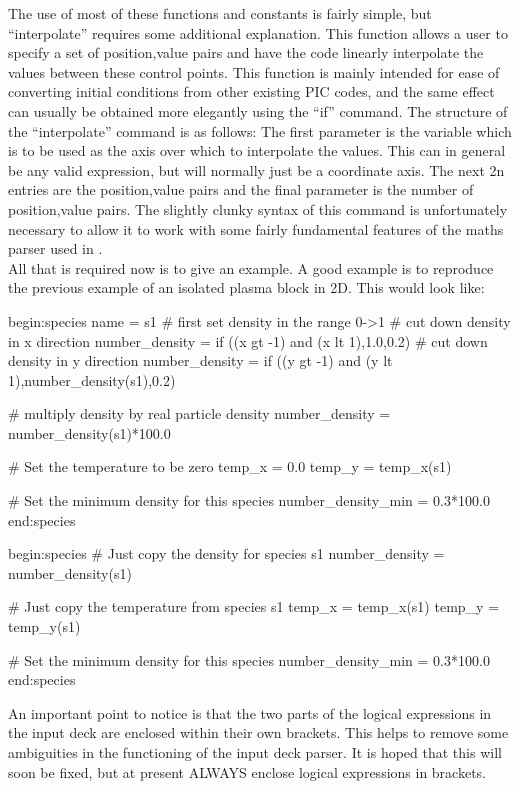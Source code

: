 The use of most of these functions and constants is fairly simple, but
``interpolate'' requires some additional explanation. This function allows a
user to specify a set of position,value pairs and have the code linearly
interpolate the values between these control points. This function is mainly
intended for ease of converting initial conditions from other existing PIC
codes, and the same effect can usually be obtained more elegantly using the
``if'' command. The structure of the ``interpolate'' command is as follows:
The first parameter is the variable which is to be used as the axis over which
to interpolate the values. This can in general be any valid expression, but
will normally just be a coordinate axis. The next 2n entries are the
position,value pairs and the final parameter is the number of position,value
pairs. The slightly clunky syntax of this command is unfortunately necessary to
allow it to work with some fairly fundamental features of the maths parser
used in {\EPOCH}.\\
All that is required now is to give an example.
A good example is to reproduce
the previous example of an isolated plasma block in 2D. This would look like:
\begin{boxverbatim}
begin:species
   name = s1
   # first set density in the range 0->1
   # cut down density in x direction
   number_density = if ((x gt -1) and (x lt 1),1.0,0.2)
   # cut down density in y direction
   number_density = if ((y gt -1) and (y lt 1),number_density(s1),0.2)

   # multiply density by real particle density
   number_density = number_density(s1)*100.0

   # Set the temperature to be zero
   temp_x = 0.0
   temp_y = temp_x(s1)

   # Set the minimum density for this species
   number_density_min = 0.3*100.0
end:species

begin:species
   # Just copy the density for species s1
   number_density = number_density(s1)

   # Just copy the temperature from species s1
   temp_x = temp_x(s1)
   temp_y = temp_y(s1)

   # Set the minimum density for this species
   number_density_min = 0.3*100.0
end:species
\end{boxverbatim}

An important point to notice is that the two parts of the logical expressions
in the input deck are enclosed within their own brackets. This helps to remove
some ambiguities in the functioning of the input deck parser. It is hoped that
this will soon be fixed, but at present ALWAYS enclose logical expressions in
brackets.

